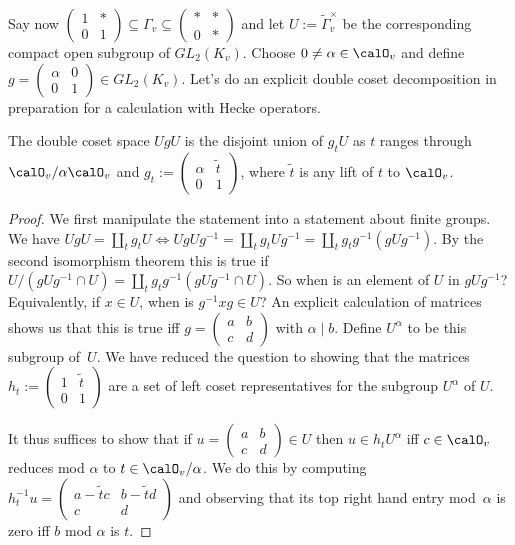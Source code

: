 Say now $\begin{pmatrix}1&*\\0&1\end{pmatrix}\subseteq\Gamma_v\subseteq\begin{pmatrix}*&*\\0&*\end{pmatrix}$
and let $U:=\tilde\Gamma_v^\times$ be the corresponding compact open subgroup of $GL_2(K_v)$.
Choose $0\not=\alpha\in\calO_v$ and define $g=\begin{pmatrix}\alpha&0\\0&1\end{pmatrix}\in GL_2(K_v)$.
Let's do an explicit double coset decomposition in preparation for a calculation with Hecke operators.

\begin{lemma} The double coset space $UgU$ is the disjoint union of $g_tU$ as $t$ ranges
  through $\calO_v/\alpha\calO_v$ and $g_t:=\begin{pmatrix}\alpha&\tilde{t}\\0&1\end{pmatrix}$,
  where $\tilde{t}$ is any lift of $t$ to $\calO_v$.
\end{lemma}
\begin{proof} We first manipulate the statement into a statement about finite groups.
  We have $UgU=\coprod_t g_tU\iff UgUg^{-1}=\coprod_t g_tUg^{-1}=\coprod_t g_tg^{-1}(gUg^{-1})$.
  By the second isomorphism theorem this is true if
  $U/(gUg^{-1}\cap U)=\coprod_t g_tg^{-1}(gUg^{-1}\cap U)$. So when is an element of $U$
  in $gUg^{-1}$? Equivalently, if $x\in U$, when is $g^{-1}xg\in U$? An explicit calculation
  of matrices shows us that this is true iff $g=\begin{pmatrix} a&b\\c&d\end{pmatrix}$ with
  $\alpha\mid b$. Define $U^\alpha$ to be this subgroup of~$U$. We have reduced the question
  to showing that the matrices $h_t:=\begin{pmatrix}1&\tilde{t}\\0&1\end{pmatrix}$
  are a set of left coset representatives for the subgroup $U^\alpha$ of $U$.

  It thus suffices to show that if $u=\begin{pmatrix} a&b\\c&d\end{pmatrix}\in U$
  then $u\in h_tU^\alpha$ iff $c\in\calO_v$ reduces mod $\alpha$ to $t\in\calO_v/\alpha$.
  We do this by computing $h_t^{-1}u=\begin{pmatrix} a-\tilde{t}c&b-\tilde{t}d\\c&d\end{pmatrix}$
  and observing that its top right hand entry mod~$\alpha$ is zero iff $b$ mod $\alpha$ is $t$.
\end{proof}

